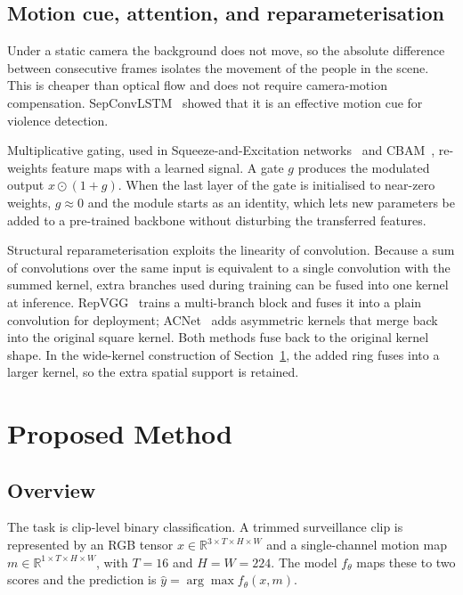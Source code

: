 \documentclass[conference]{IEEEtran}
\begin{document}
\subsection{Motion cue, attention, and reparameterisation}

Under a static camera the background does not move, so the absolute
difference between consecutive frames isolates the movement of the
people in the scene. This is cheaper than optical flow and does not
require camera-motion compensation. SepConvLSTM~\cite{sepconvlstm}
showed that it is an effective motion cue for violence detection.

Multiplicative gating, used in Squeeze-and-Excitation
networks~\cite{se} and CBAM~\cite{cbam}, re-weights feature maps with
a learned signal. A gate $g$ produces the modulated output
$x \odot (1+g)$. When the last layer of the gate is initialised to
near-zero weights, $g \approx 0$ and the module starts as an identity,
which lets new parameters be added to a pre-trained backbone without
disturbing the transferred features.

Structural reparameterisation exploits the linearity of convolution.
Because a sum of convolutions over the same input is equivalent to a
single convolution with the summed kernel, extra branches used during
training can be fused into one kernel at inference. RepVGG~\cite{repvgg}
trains a multi-branch block and fuses it into a plain convolution for
deployment; ACNet~\cite{acnet} adds asymmetric kernels that merge back
into the original square kernel. Both methods fuse back to the original
kernel shape. In the wide-kernel construction of
Section~\ref{sec:method}, the added ring fuses into a larger kernel,
so the extra spatial support is retained.

\section{Proposed Method}
\label{sec:method}

\subsection{Overview}

The task is clip-level binary classification. A trimmed surveillance
clip is represented by an RGB tensor $x \in \mathbb{R}^{3 \times T
\times H \times W}$ and a single-channel motion map $m \in
\mathbb{R}^{1 \times T \times H \times W}$, with $T=16$ and
$H=W=224$. The model $f_\theta$ maps these to two scores and the
prediction is $\hat{y} = \arg\max f_\theta(x, m)$.
\end{document}
